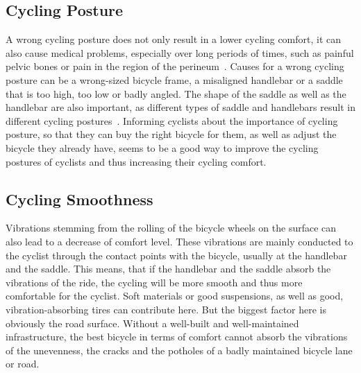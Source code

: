 \subsection*{Cycling Posture}
A wrong cycling posture does not only result in a lower cycling comfort, it can also cause medical problems, especially over long periods of times, such as painful pelvic bones or pain in the region of the
perineum~\cite{christiaans1998comfort}.
Causes for a wrong cycling posture can be a wrong-sized bicycle frame, a misaligned handlebar or a saddle that is too high, too low or badly angled.
The shape of the saddle as well as the handlebar are also important, as different types of saddle and handlebars result in different cycling postures~\cite{bressel2003bicycle}.
Informing cyclists about the importance of cycling posture, so that they can buy the right bicycle for them, as well as adjust the bicycle they already have, seems to be a good way to improve the cycling postures of cyclists and thus increasing their cycling comfort.

\subsection*{Cycling Smoothness}
Vibrations stemming from the rolling of the bicycle wheels on the surface can also lead to a decrease of comfort level.
These vibrations are mainly conducted to the cyclist through the contact points with the bicycle, usually at the handlebar and the saddle.
This means, that if the handlebar and the saddle absorb the vibrations of the ride, the cycling will be more smooth and thus more comfortable for the cyclist.
Soft materials or good suspensions, as well as good, vibration-absorbing tires can contribute here.
But the biggest factor here is obviously the road surface.
Without a well-built and well-maintained infrastructure, the best bicycle in terms of comfort cannot absorb the vibrations of the unevenness, the cracks and the potholes of a badly maintained bicycle lane or road.

